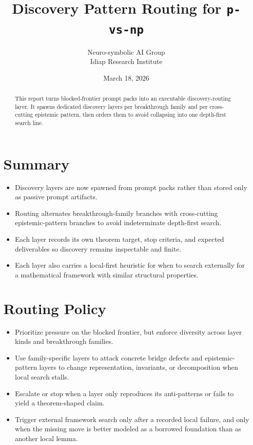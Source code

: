 \documentclass[11pt]{article}
\title{Discovery Pattern Routing for \texttt{p-vs-np}}
\author{Neuro-symbolic AI Group\\Idiap Research Institute}
\date{March 18, 2026}
\begin{document}
\maketitle

\begin{abstract}
This report turns blocked-frontier prompt packs into an executable discovery-routing layer. It spawns dedicated discovery layers per breakthrough family and per cross-cutting epistemic pattern, then orders them to avoid collapsing into one depth-first search line.
\end{abstract}

\section{Summary}
\begin{itemize}[leftmargin=*,itemsep=0.2em]
\item Discovery layers are now spawned from prompt packs rather than stored only as passive prompt artifacts.
\item Routing alternates breakthrough-family branches with cross-cutting epistemic-pattern branches to avoid indeterminate depth-first search.
\item Each layer records its own theorem target, stop criteria, and expected deliverables so discovery remains inspectable and finite.
\item Each layer also carries a local-first heuristic for when to search externally for a mathematical framework with similar structural properties.
\end{itemize}

\section{Routing Policy}
\begin{itemize}[leftmargin=*,itemsep=0.2em]
\item Prioritize pressure on the blocked frontier, but enforce diversity across layer kinds and breakthrough families.
\item Use family-specific layers to attack concrete bridge defects and epistemic-pattern layers to change representation, invariants, or decomposition when local search stalls.
\item Escalate or stop when a layer only reproduces its anti-patterns or fails to yield a theorem-shaped claim.
\item Trigger external framework search only after a recorded local failure, and only when the missing move is better modeled as a borrowed foundation than as another local lemma.
\end{itemize}
\end{document}
